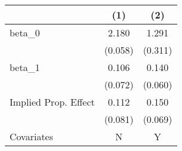\begin{tabular}[t]{lcc}
\toprule
  & (1) & (2)\\
\midrule
beta\_0 & 2.180 & 1.291\\
 & (0.058) & (0.311)\\
beta\_1 & 0.106 & 0.140\\
 & (0.072) & (0.060)\\
Implied Prop. Effect & 0.112 & 0.150\\
 & (0.081) & (0.069)\\
\midrule
Covariates & N & Y\\
\bottomrule
\end{tabular}
